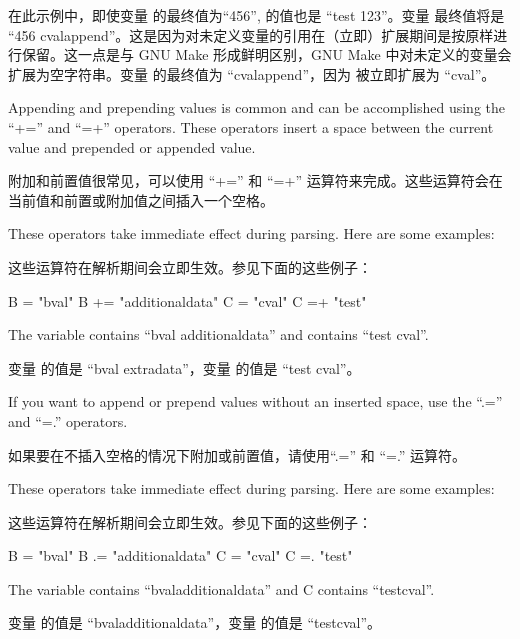 在此示例中，即使变量  的最终值为``456'',  的值也是 ``test 123''。变量  最终值将是 ``456 cvalappend''。这是因为对未定义变量的引用在（立即）扩展期间是按原样进行保留。这一点是与 GNU Make 形成鲜明区别，GNU Make 中对未定义的变量会扩展为空字符串。变量  的最终值为 ``cvalappend''，因为  被立即扩展为 ``cval''。


Appending and prepending values is common and can be accomplished using the ``+='' and ``=+'' operators. These operators insert a space between the current value and prepended or appended value.

附加和前置值很常见，可以使用 ``+='' 和 ``=+'' 运算符来完成。这些运算符会在当前值和前置或附加值之间插入一个空格。

These operators take immediate effect during parsing. Here are some examples:

这些运算符在解析期间会立即生效。参见下面的这些例子：

\begin{pyglist}
B = "bval"
B += "additionaldata"
C = "cval"
C =+ "test"
\end{pyglist}

The variable  contains ``bval additionaldata'' and  contains ``test cval''.

变量  的值是 ``bval extradata''，变量  的值是 ``test cval''。


If you want to append or prepend values without an inserted space, use the ``.='' and ``=.'' operators.

如果要在不插入空格的情况下附加或前置值，请使用``.='' 和 ``=.'' 运算符。

These operators take immediate effect during parsing. Here are some examples:

这些运算符在解析期间会立即生效。参见下面的这些例子：

\begin{pyglist}
B = "bval"
B .= "additionaldata"
C = "cval"
C =. "test"
\end{pyglist}

The variable  contains ``bvaladditionaldata'' and C contains ``testcval''.

变量  的值是 ``bvaladditionaldata''，变量  的值是 ``testcval''。

